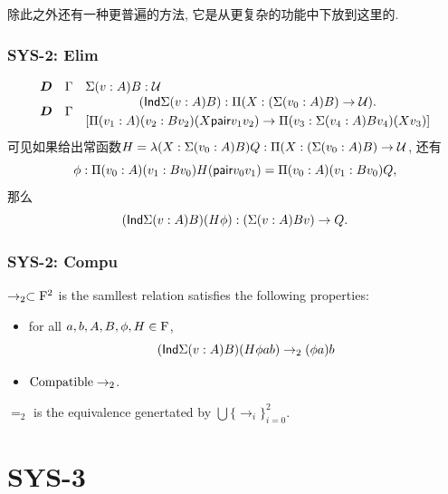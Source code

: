 除此之外还有一种更普遍的方法, 它是从更复杂的功能中下放到这里的. 


\subsubsection*{SYS-2: Elim}

\[
  \begin{array}{lll}
    \bm D & \Gamma & \Sigma (v : A) B : \cl U   
    \\
    \bm D & \Gamma & \begin{gathered}  (\cc{Ind} \Sigma (v : A) B) :  \Pi (X:(\Sigma(v_0 : A)B) \rightarrow \cl U ) . \\  [\Pi(v_1 : A)(v_2 : B v_2) (X \cc{pair} v_1 v_2) \rightarrow \Pi(v_3: \Sigma(v_4 : A)B v_4) (X v_3)]
 \end{gathered}
  \end{array}
\]
可见如果给出常函数$H = \lambda(X : \Sigma(v_0 : A)B)Q : \Pi (X:(\Sigma(v_0 : A)B) \rightarrow \mathcal{U} $, 还有
\[
  \phi : \Pi (v_0 : A)(v_1 : B v_0) H (\text{{\sffamily pair}} v_0 v_1) =  \Pi (v_0 : A)(v_1 : B v_0) Q,
\]
那么
\[
  (\text{{\sffamily Ind}}\Sigma (v : A) B) (H \phi) : (\Sigma (v : A) Bv) \rightarrow Q.
\]



\subsubsection*{SYS-2: Compu}

 \begin{definition}
  $\rightarrow_{2} \subset \mathrm{F}^2$ is the samllest relation satisfies the following properties:
  \begin{itemize}
    \item for all $ a, b, A, B, \phi, H \in \mathrm{F}$,
      \[
        (\text{{\sffamily Ind}}\Sigma(v: A)B)(H\phi a b) \rightarrow_2 (\phi a) b
      \]
    \item $\mathrm{Compatible}\rightarrow_2$.
  \end{itemize}
  $=_2$ is the equivalence genertated by $ \bigcup \{ \rightarrow_i \}_{i=0}^2$.
\end{definition}







\section{SYS-3}


